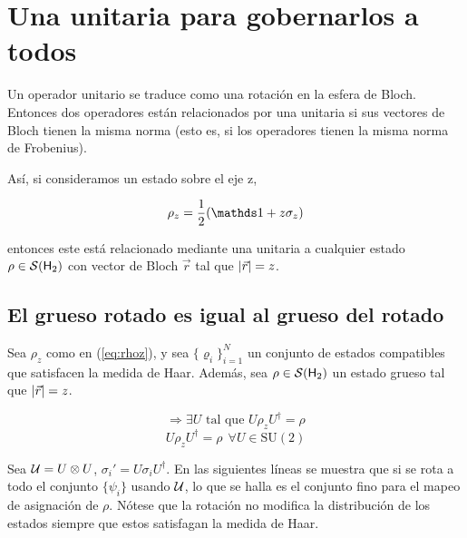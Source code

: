 \section{Una unitaria para gobernarlos a todos}

Un operador unitario se traduce como una rotación en la esfera de Bloch. Entonces dos operadores están relacionados por una unitaria si sus vectores de Bloch tienen la misma norma (esto es, si los operadores tienen la misma norma de Frobenius).

Así, si consideramos un estado sobre el eje z,

\begin{equation}\label{eq:rhoz}
\rho_{z}=\frac{1}{2}\qty(\Id+z\sigma_{z})
\end{equation}

entonces este está relacionado mediante una unitaria a cualquier estado $\rho\in\mathcal{S}({\sf H}_2)$ con vector de Bloch $\vec{r}$ tal que $\abs{\vec{r}}=z$.

\subsection{El grueso rotado es igual al grueso del rotado}
Sea $\rho_{z}$ como en (\ref{eq:rhoz}), y sea $\{\varrho_{i}\}_{i=1}^{N}$ un conjunto de estados compatibles que satisfacen la medida de Haar. Además, sea $\rho\in\mathcal{S}( {\sf H}_2)$ un estado grueso tal que $\abs{\vec{r}}=z$.

\begin{equation}
\Rightarrow \exists U \text{ tal que } U\rho_{z}U^{\dag}=\rho
\end{equation}
\begin{equation}
U\rho_{z}U^{\dag}=\rho \ \  \forall U\in \text{SU}(2)
\end{equation}

Sea $\mathcal{U}=U\otimes U$, $\sigma_{i}'=U\sigma_{i}U^{\dag}$. En las siguientes líneas se muestra que si se rota a todo el conjunto $\{\psi_{i}\}$ usando $\mathcal{U}$, lo que se halla es el conjunto fino para el mapeo de asignación de $\rho$. Nótese que la rotación no modifica la distribución de los estados siempre que estos satisfagan la medida de Haar.

